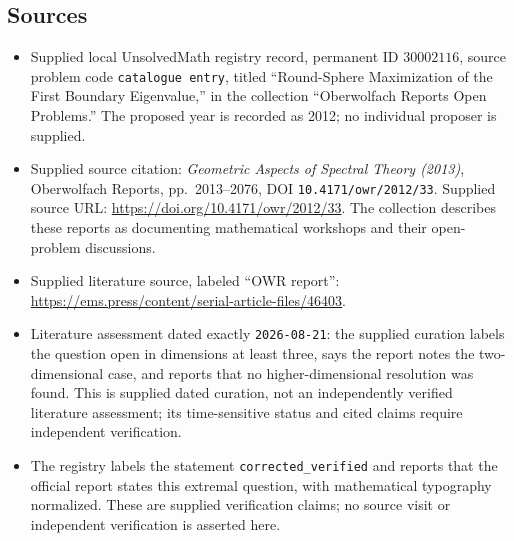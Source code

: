\documentclass[11pt]{article}
\begin{document}
\subsection{Sources}
\begin{itemize}
\item Supplied local UnsolvedMath registry record, permanent ID \(30002116\), source problem code \texttt{catalogue entry}, titled ``Round-Sphere Maximization of the First Boundary Eigenvalue,'' in the collection ``Oberwolfach Reports Open Problems.'' The proposed year is recorded as 2012; no individual proposer is supplied.
\item Supplied source citation: \emph{Geometric Aspects of Spectral Theory (2013)}, Oberwolfach Reports, pp.\ 2013--2076, DOI \texttt{10.4171/owr/2012/33}. Supplied source URL: \url{https://doi.org/10.4171/owr/2012/33}. The collection describes these reports as documenting mathematical workshops and their open-problem discussions.
\item Supplied literature source, labeled ``OWR report'': \url{https://ems.press/content/serial-article-files/46403}.
\item Literature assessment dated exactly \texttt{2026-08-21}: the supplied curation labels the question open in dimensions at least three, says the report notes the two-dimensional case, and reports that no higher-dimensional resolution was found. This is supplied dated curation, not an independently verified literature assessment; its time-sensitive status and cited claims require independent verification.
\item The registry labels the statement \texttt{corrected\_verified} and reports that the official report states this extremal question, with mathematical typography normalized. These are supplied verification claims; no source visit or independent verification is asserted here.
\end{itemize}
\end{document}
